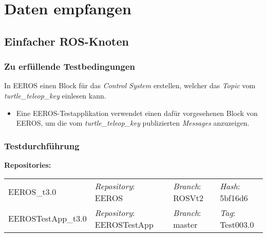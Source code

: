 \section{Daten empfangen}
\subsection{Einfacher ROS-Knoten}
\subsubsection{Zu erfüllende Testbedingungen}
In EEROS einen Block für das \textit{Control System} erstellen, welcher das \textit{Topic} vom \textit{turtle\_teleop\_key} einlesen kann.
\begin{itemize}
\item Eine EEROS-Testapplikation verwendet einen dafür vorgesehenen Block von EEROS, um die vom \textit{turtle\_teleop\_key} publizierten \textit{Messages} anzuzeigen.
\end{itemize}

\subsubsection{Testdurchführung}
\textbf{Repositories:} \\
\begin{tabular}
  { l						| l			 							l								 l								}

  EEROS\_t3.0				& \textit{Repository}: EEROS			& \textit{Branch}: ROSVt2		& \textit{Hash}: 5bf16d6		\\
  EEROSTestApp\_t3.0		& \textit{Repository}: EEROSTestApp	& \textit{Branch}: master		& \textit{Tag}: Test003.0		\\
\end{tabular}

